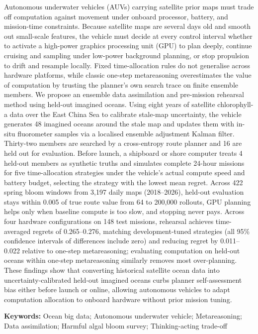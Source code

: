 Autonomous underwater vehicles (AUVs) carrying satellite prior maps must trade off computation against movement under onboard processor, battery, and mission-time constraints. Because satellite maps are several days old and smooth out small-scale features, the vehicle must decide at every control interval whether to activate a high-power graphics processing unit (GPU) to plan deeply, continue cruising and sampling under low-power background planning, or stop propulsion to drift and resample locally. Fixed time-allocation rules do not generalise across hardware platforms, while classic one-step metareasoning overestimates the value of computation by trusting the planner's own search trace on finite ensemble members. We propose an ensemble data assimilation and pre-mission rehearsal method using held-out imagined oceans. Using eight years of satellite chlorophyll-a data over the East China Sea to calibrate stale-map uncertainty, the vehicle generates 48 imagined oceans around the stale map and updates them with in-situ fluorometer samples via a localised ensemble adjustment Kalman filter. Thirty-two members are searched by a cross-entropy route planner and 16 are held out for evaluation. Before launch, a shipboard or shore computer treats 4 held-out members as synthetic truths and simulates complete 24-hour missions for five time-allocation strategies under the vehicle's actual compute speed and battery budget, selecting the strategy with the lowest mean regret. Across 422 spring bloom windows from 3,197 daily maps (2018--2026), held-out evaluation stays within 0.005 of true route value from 64 to 200,000 rollouts, GPU planning helps only when baseline compute is too slow, and stopping never pays. Across four hardware configurations on 148 test missions, rehearsal achieves time-averaged regrets of 0.265--0.276, matching development-tuned strategies (all 95\% confidence intervals of differences include zero) and reducing regret by 0.011--0.022 relative to one-step metareasoning; evaluating computation on held-out oceans within one-step metareasoning similarly removes most over-planning. These findings show that converting historical satellite ocean data into uncertainty-calibrated held-out imagined oceans curbs planner self-assessment bias either before launch or online, allowing autonomous vehicles to adapt computation allocation to onboard hardware without prior mission tuning.

\vspace{1em}
\noindent\textbf{Keywords: }Ocean big data; Autonomous underwater vehicle; Metareasoning; Data assimilation; Harmful algal bloom survey; Thinking-acting trade-off
